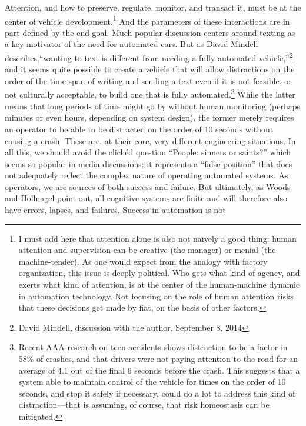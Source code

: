 Attention, and how to preserve, regulate, monitor, and transact it,
must be at the center of vehicle development.\footnote{I must add here
that attention alone is also not na\"{\i}vely a good thing:
human attention and supervision can be creative (the manager) or
menial (the machine-tender). As one would expect from the analogy with
factory organization, this issue is deeply political. Who gets what
kind of agency, and exerts what kind of attention, is at the center of
the human-machine dynamic in automation technology. Not focusing on
the role of human attention risks that these decisions get made
by fiat, on the basis of other factors.} And the parameters of
these interactions are in part defined by the end goal. Much popular
discussion centers around texting as a key motivator of the need for
automated cars. But as 
David Mindell describes,``wanting to text is different
from needing a fully automated vehicle,''\footnote{David Mindell,
  discussion with the author, September 8, 2014} and it seems quite possible
to create a vehicle that will allow distractions on the order of the
time span of writing and sending a text even if it is not feasible, or
not culturally acceptable, to build one that is fully
automated.\footnote{Recent AAA research on teen accidents shows
  distraction to be a factor in 58\% of crashes, and that drivers were
not paying attention to the road for an average of 4.1 out of the
final 6 seconds before the crash. This suggests that a system able to
maintain control of the vehicle for times on the order of 10 seconds,
and stop it safely if necessary, could do a lot to address this kind
of distraction---that is assuming, of course, that risk homeostasis
can be mitigated.} While
the latter means that long periods of time might go by without human
monitoring (perhaps minutes or even hours, depending on system
design), the former merely requires an operator to be able to be 
distracted on the order of 10 seconds without causing a crash. These
are, at their core, very different engineering situations. In
all this, we should avoid the clich\'{e}d question ``People: sinners
or saints?'' which seems so popular in media discussions: it represents
a ``false position'' that does not adequately reflect the complex
nature of operating automated
systems\cite[p. ??]{???-woodshollnagel-JCS-ch1}. As operators, we are
sources of both success and failure. But ultimately, as Woods and
Hollnagel point out, all cognitive systems are finite and will
therefore also have errors, lapses, and
failures\cite[p. ??]{???-woodshollnagel}. Success in automation is not
